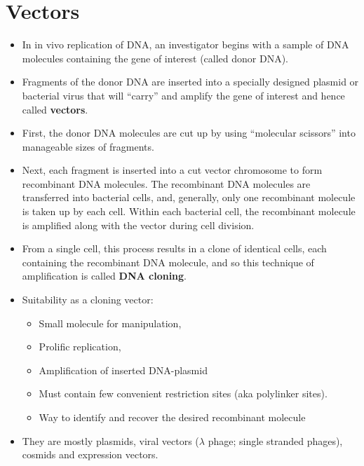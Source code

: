 \documentclass[11pt,dvipsnames,ignorenonframetext,aspectratio=169]{beamer}
\providecommand{\tightlist}{%
  \setlength{\itemsep}{0pt}\setlength{\parskip}{0pt}}
\begin{document}
\hypertarget{vectors}{%
\section{Vectors}\label{vectors}}

\begin{frame}{}
\protect\hypertarget{section-17}{}
\begin{itemize}
\tightlist
\item
  In in vivo replication of DNA, an investigator begins with a sample of
  DNA molecules containing the gene of interest (called donor DNA).
\item
  Fragments of the donor DNA are inserted into a specially designed
  plasmid or bacterial virus that will ``carry'' and amplify the gene of
  interest and hence called \textbf{vectors}.
\item
  First, the donor DNA molecules are cut up by using ``molecular
  scissors'' into manageable sizes of fragments.
\item
  Next, each fragment is inserted into a cut vector chromosome to form
  recombinant DNA molecules. The recombinant DNA molecules are
  transferred into bacterial cells, and, generally, only one recombinant
  molecule is taken up by each cell. Within each bacterial cell, the
  recombinant molecule is amplified along with the vector during cell
  division.
\item
  From a single cell, this process results in a clone of identical
  cells, each containing the recombinant DNA molecule, and so this
  technique of amplification is called \textbf{DNA cloning}.
\end{itemize}
\end{frame}

\begin{frame}{}
\protect\hypertarget{section-18}{}
\begin{itemize}
\tightlist
\item
  Suitability as a cloning vector:

  \begin{itemize}
  \tightlist
  \item
    Small molecule for manipulation,
  \item
    Prolific replication,
  \item
    Amplification of inserted DNA-plasmid
  \item
    Must contain few convenient restriction sites (aka polylinker
    sites).
  \item
    Way to identify and recover the desired recombinant molecule
  \end{itemize}
\item
  They are mostly plasmids, viral vectors (\(\lambda\) phage; single
  stranded phages), cosmids and expression vectors.
\end{itemize}
\end{frame}
\end{document}
